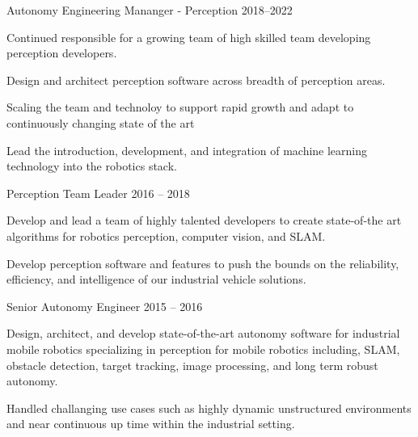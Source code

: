 \documentclass[11pt, a4paper]{awesome-cv}
\begin{document}
\begin{cventries}
\vspace*{-2mm}
\cventry
  {Autonomy Engineering Mananger - Perception}
  {}
  {}
  {2018--2022}
  {
    \begin{cvitems}
      \item Continued responsible for a growing team of high skilled team developing perception developers.     
      \item Design and architect perception software across breadth of perception areas.
      \item Scaling the team and technoloy to support rapid growth and adapt to continuously changing state of the art
      \item Lead the introduction, development, and integration of machine learning technology into the robotics stack.
     \end{cvitems} 
  }

\vspace*{-2mm}
\cventry
  {Perception Team Leader} 
  {}
  {}
  {2016 -- 2018}
  {
    \begin{cvitems}
      \item Develop and lead a team of highly talented developers to create state-of-the art algorithms for robotics perception, computer vision, and SLAM.
      \item Develop perception software and features to push the bounds on the reliability, efficiency, and intelligence of our industrial vehicle solutions.
    \end{cvitems} 
  }

\vspace*{-2mm}
\cventry
  {Senior Autonomy Engineer} 
  {}
  {}
  {2015 -- 2016}
  {
    \begin{cvitems}
      \item Design, architect, and develop state-of-the-art autonomy software for industrial mobile robotics specializing in perception for mobile robotics including, SLAM, obstacle detection, target tracking, image processing, and long term robust autonomy.
      \item Handled challanging use cases such as highly dynamic unstructured environments and near continuous up time within the industrial setting.
    \end{cvitems} 
  }


\end{cventries}
\end{document}
